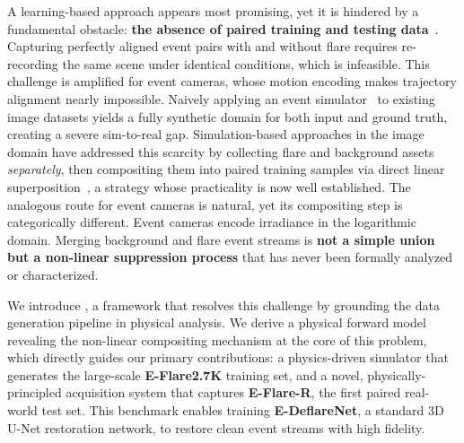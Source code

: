 A learning-based approach appears most promising, yet it is hindered by a fundamental obstacle: \textbf{the absence of paired training and testing data}~\cite{dai2022flare7k,dai2024flare7k++}. Capturing perfectly aligned event pairs with and without flare requires re-recording the same scene under identical conditions, which is infeasible. This challenge is amplified for event cameras, whose motion encoding makes trajectory alignment nearly impossible. Naively applying an event simulator~\cite{hu2021v2e,lin2022dvs,joubert2021event,zhang2023v2ce,han2024physical} to existing image datasets yields a fully synthetic domain for both input and ground truth, creating a severe sim-to-real gap. Simulation-based approaches in the image domain have addressed this scarcity by collecting flare and background assets \emph{separately}, then compositing them into paired training samples via direct linear superposition~\cite{wu2021train,dai2022flare7k,dai2024flare7k++}, a strategy whose practicality is now well established. The analogous route for event cameras is natural, yet its compositing step is categorically different. Event cameras encode irradiance in the logarithmic domain. Merging background and flare event streams is \textbf{not a simple union but a non-linear suppression process} that has never been formally analyzed or characterized.



We introduce \emph{\ours}, a framework that resolves this challenge by grounding the data generation pipeline in physical analysis. We derive a physical forward model revealing the non-linear compositing mechanism at the core of this problem, which directly guides our primary contributions: a physics-driven simulator that generates the large-scale \textbf{E-Flare2.7K} training set, and a novel, physically-principled acquisition system that captures \textbf{E-Flare-R}, the first paired real-world test set. This benchmark enables training \textbf{E-DeflareNet}, a standard 3D U-Net restoration network, to restore clean event streams with high fidelity.


